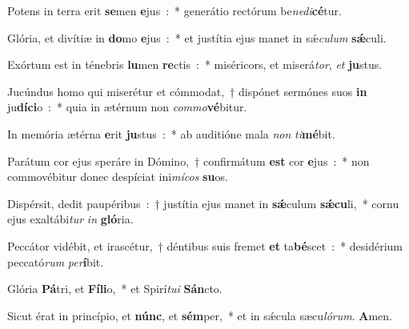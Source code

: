 ﻿\item Potens in terra erit \textbf{se}\-men \textbf{e}\-jus~:~* generátio rectórum be\emph{ne}\-\emph{di}\-\textbf{cé}\-tur.
\item Glória, et divítiæ in \textbf{do}\-mo \textbf{e}\-jus~:~* et justítia ejus manet in sǽ\emph{cu}\-\emph{lum} \textbf{sǽ}\-culi.
\item Exórtum est in ténebris \textbf{lu}\-men \textbf{re}\-ctis~:~* miséricors, et miserá\emph{tor}, \emph{et} \textbf{ju}\-stus.
\item Jucúndus homo qui miserétur et cómmodat,~† dispónet sermónes suos \textbf{in} ju\textbf{dí}\-\textbf{ci}\-o~:~* quia in ætérnum non \emph{com}\-\emph{mo}\-\textbf{vé}\-bitur.
\item In memória ætérna \textbf{e}\-rit \textbf{ju}\-stus~:~* ab auditióne mala \emph{non} \emph{ti}\-\textbf{mé}\-bit.
\item Parátum cor ejus speráre in Dómino,~† confirmátum \textbf{est} cor \textbf{e}\-jus~:~* non commovébitur donec despíciat ini\emph{mí}\-\emph{cos} \textbf{su}\-os.
\item Dispérsit, dedit paupéribus~:~† justítia ejus manet in \textbf{sǽ}\-culum \textbf{sǽ}\-\textbf{cu}\-li,~* cornu ejus exaltábi\emph{tur} \emph{in} \textbf{gló}\-ria.
\item Peccátor vidébit, et irascétur,~† déntibus suis fremet \textbf{et} ta\textbf{bé}\-scet~:~* desidérium peccató\emph{rum} \emph{per}\-\textbf{í}\-bit.
\item Glória \textbf{Pá}\-tri, et \textbf{Fí}\-\textbf{li}\-o,~* et Spirí\emph{tu}\-\emph{i} \textbf{Sán}\-cto.
\item Sicut érat in princípio, et \textbf{núnc}, et \textbf{sém}\-per,~* et in sǽcula sæcu\emph{ló}\-\emph{rum}. \textbf{A}\-men.